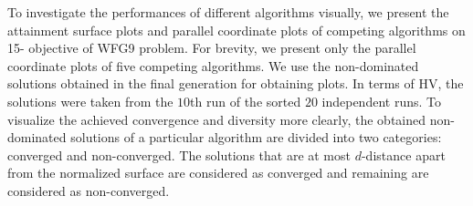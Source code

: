 \documentclass[review]{elsarticle}
\begin{document}
To investigate the performances of different algorithms visually, we present the attainment surface plots and parallel coordinate plots of competing algorithms on 15- objective of WFG9 problem. For brevity, we present only the parallel coordinate plots of five competing algorithms. %
We use the non-dominated solutions obtained in the final generation for obtaining plots. In terms of HV, the solutions were taken from the $10$th run of the sorted $20$ independent runs.
To visualize the achieved convergence and diversity more clearly, the obtained non-dominated solutions of a particular algorithm are divided into two categories: converged and non-converged. The solutions that are at most $d$-distance apart from the normalized surface are considered as converged and remaining are considered as non-converged.


\end{document}
